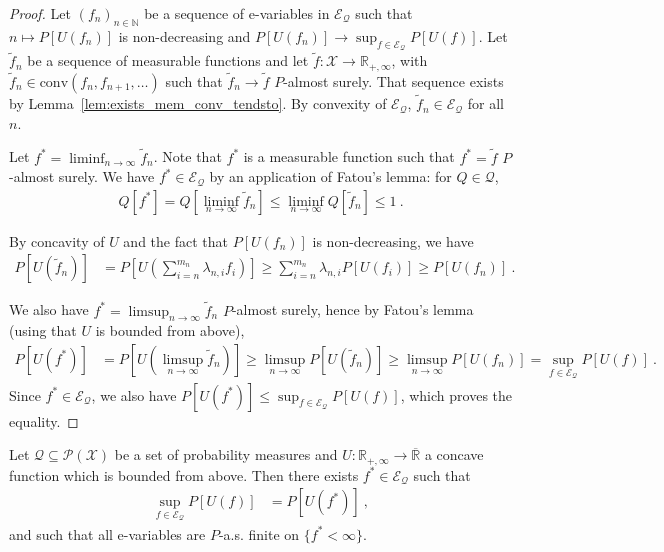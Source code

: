 \begin{proof}
Let $(f_n)_{n \in \mathbb{N}}$ be a sequence of e-variables in $\mathcal{E}_{\mathcal{Q}}$ such that $n \mapsto P[U(f_n)]$ is non-decreasing and $P[U(f_n)] \to \sup_{f \in \mathcal{E}_{\mathcal{Q}}} P[U(f)]$.
Let $\tilde{f}_n$ be a sequence of measurable functions and let $\tilde{f} : \mathcal{X} \to \mathbb{R}_{+, \infty}$, with $\tilde{f}_n \in \mathrm{conv}(f_n, f_{n+1}, \ldots)$ such that $\tilde{f}_n \to \tilde{f}$ $P$-almost surely.
That sequence exists by Lemma~\ref{lem:exists_mem_conv_tendsto}.
By convexity of $\mathcal{E}_{\mathcal{Q}}$, $\tilde{f}_n \in \mathcal{E}_{\mathcal{Q}}$ for all $n$.

Let $f^* = \liminf_{n \to \infty} \tilde{f}_n$. Note that $f^*$ is a measurable function such that $f^* = \tilde{f}$ $P$-almost surely.
We have $f^* \in \mathcal{E}_{\mathcal{Q}}$ by an application of Fatou's lemma: for $Q \in \mathcal{Q}$,
\begin{align*}
  Q[f^*]
  = Q[\liminf_{n \to \infty} \tilde{f}_n]
  \le \liminf_{n \to \infty} Q[\tilde{f}_n]
  \le 1
  \: .
\end{align*}

By concavity of $U$ and the fact that $P[U(f_n)]$ is non-decreasing, we have
\begin{align*}
  P[U(\tilde{f}_n)]
  &= P[U(\sum_{i=n}^{m_n} \lambda_{n,i} f_{i})]
  \ge \sum_{i=n}^{m_n} \lambda_{n,i} P[U(f_{i})]
  \ge P[U(f_n)]
  \: .
\end{align*}

We also have $f^* = \limsup_{n \to \infty} \tilde{f}_n$ $P$-almost surely, hence by Fatou's lemma (using that $U$ is bounded from above),
\begin{align*}
  P[U(f^*)]
  &= P[U(\limsup_{n \to \infty} \tilde{f}_n)]
  \ge \limsup_{n \to \infty} P[U(\tilde{f}_n)]
  \ge \limsup_{n \to \infty} P[U(f_n)]
  = \sup_{f \in \mathcal{E}_{\mathcal{Q}}} P[U(f)]
  \: .
\end{align*}
Since $f^* \in \mathcal{E}_{\mathcal{Q}}$, we also have $P[U(f^*)] \le \sup_{f \in \mathcal{E}_{\mathcal{Q}}} P[U(f)]$, which proves the equality.
\end{proof}


\begin{lemma}\label{lem:exists_integral_utility_eq_sup_forall_lt_top}
Let $\mathcal{Q} \subseteq \mathcal{P}(\mathcal{X})$ be a set of probability measures and $U : \mathbb{R}_{+,\infty} \to \overline{\mathbb{R}}$ a concave function which is bounded from above.
Then there exists $f^* \in \mathcal{E}_{\mathcal{Q}}$ such that
\begin{align*}
  \sup_{f \in \mathcal{E}_{\mathcal{Q}}} P[U(f)]
  &= P[U(f^*)]
  \: ,
\end{align*}
and such that all e-variables are $P$-a.s. finite on $\{f^* < \infty\}$.
\end{lemma}

